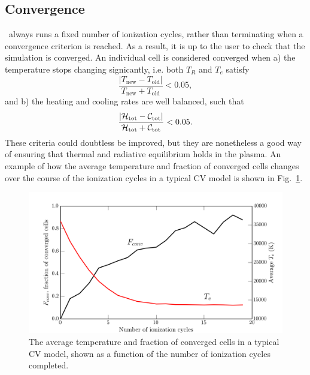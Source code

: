 \subsection{Convergence}

\label{sec:convergence}

\py\ always runs a fixed number of ionization cycles, rather than terminating
when a convergence criterion is reached. As a result, it is up to the user
to check that the simulation is converged. An individual cell is considered
converged when a) the temperature stops changing signicantly, i.e. both
$T_R$ and $T_e$ satisfy
\begin{equation}
\frac{|T_{\mathrm{new}} - T_{\mathrm{old}}|}{T_{\mathrm{new}} + T_{\mathrm{old}}} < 0.05,
\end{equation}
and b) the heating and cooling rates are well balanced, such that
\begin{equation}
\frac{|{\cal H}_{\mathrm{tot}} - {\cal C}_{\mathrm{tot}}|}{{\cal H}_{\mathrm{tot}} + {\cal C}_{\mathrm{tot}}} < 0.05.
\end{equation}
These criteria could doubtless be improved, but they are nonetheless
a good way of ensuring that thermal and radiative equilibrium holds in the 
plasma. An example of how the average temperature and fraction
of converged cells changes over the course of the ionization cycles in
a typical CV model is shown in Fig.~\ref{fig:conv}.


\begin{figure}
\centering
\includegraphics[width=1.0\textwidth]{figures/03-radtrans/graph_conv.png}
\caption
{
The average temperature and fraction of converged cells in
a typical CV model, shown as a function of the number of ionization cycles
completed. 
} 
\label{fig:conv}
\end{figure}




